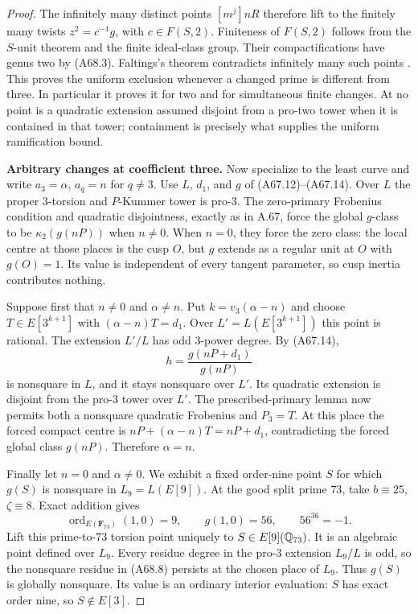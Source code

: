 \begin{proof}
The infinitely many distinct
points $[m^j]nR$ therefore lift
to the finitely many twists
$z^2=c^{-1}g$, with
$c\in F(S,2)$. Finiteness of
$F(S,2)$ follows from the
$S$-unit theorem and the
finite ideal-class group.
Their compactifications have
genus two by (A68.3).
Faltings's theorem contradicts
infinitely many such points
\citep[Satz~7 and the correction]{AMFaltings1983,AMFaltings1984Erratum}.
This proves the uniform
exclusion whenever a changed
prime is different from three.
In particular it proves it
for two and for simultaneous
finite changes. At no point
is a quadratic extension
assumed disjoint from a
pro-two tower when it is
contained in that tower;
containment is precisely
what supplies the uniform
ramification bound.

\par\smallskip\noindent\textbf{Arbitrary changes at coefficient three.}\enspace 
Now specialize to the least
curve and write $a_3=\alpha$,
$a_q=n$ for $q\ne3$.
Use $L$, $d_1$, and $g$ of
(A67.12)--(A67.14).
Over $L$ the proper
$3$-torsion and $P$-Kummer
tower is pro-$3$.
The zero-primary Frobenius
condition and quadratic
disjointness, exactly as
in A.67, force the global
$g$-class to be
$\kappa_2(g(nP))$ when
$n\ne0$. When $n=0$, they
force the zero class:
the local centre at those
places is the cusp $O$,
but $g$ extends as a regular
unit at $O$ with $g(O)=1$.
Its value is independent
of every tangent parameter,
so cusp inertia contributes
nothing.

Suppose first that $n\ne0$
and $\alpha\ne n$. Put
$k=v_3(\alpha-n)$ and
choose $T\in E[3^{k+1}]$
with $(\alpha-n)T=d_1$.
Over $L'=L(E[3^{k+1}])$
this point is rational.
The extension $L'/L$
has odd $3$-power degree.
By (A67.14),
\[
 h=\frac{g(nP+d_1)}{g(nP)}
 \tag{A68.7}
\]
is nonsquare in $L$, and
it stays nonsquare over
$L'$. Its quadratic extension
is disjoint from the pro-$3$
tower over $L'$.
The prescribed-primary lemma
now permits both a nonsquare
quadratic Frobenius and
$P_3=T$. At this place the
forced compact centre is
$nP+(\alpha-n)T=nP+d_1$,
contradicting the forced
global class $g(nP)$.
Therefore $\alpha=n$.

Finally let $n=0$ and
$\alpha\ne0$. We exhibit
a fixed order-nine point
$S$ for which $g(S)$ is
nonsquare in $L_9=L(E[9])$.
At the good split prime
$73$, take $b\equiv25$,
$\zeta\equiv8$. Exact
addition gives
\[
 \operatorname{ord}_{E(\mathbf F_{73})}
           (1,0)=9,\qquad
 g(1,0)=56,\qquad 56^{36}=-1.
 \tag{A68.8}
\]
Lift this prime-to-$73$
torsion point uniquely to
$S\in E[9](\mathbb Q_{73})$.
It is an algebraic point
defined over $L_9$.
Every residue degree in
the pro-$3$ extension
$L_9/L$ is odd, so the
nonsquare residue in
(A68.8) persists at the
chosen place of $L_9$.
Thus $g(S)$ is globally
nonsquare. Its value is an
ordinary interior evaluation:
$S$ has exact order nine,
so $S\notin E[3]$.


\end{proof}
